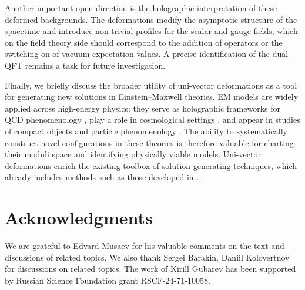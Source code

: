 \documentclass[12pt, utf8]{article}
\numberwithin{equation}{section}
\begin{document}
Another important open direction is the holographic interpretation of these deformed backgrounds. The deformations modify the asymptotic structure of the spacetime and introduce non-trivial profiles for the scalar and gauge fields, which on the field theory side should correspond to the addition of operators or the switching on of vacuum expectation values. A precise identification of the dual QFT remains a task for future investigation.

Finally, we briefly discuss the broader utility of uni-vector deformations as a tool for generating new solutions in Einstein--Maxwell theories. 
EM models are widely applied across high-energy physics: they serve as holographic frameworks for QCD phenomenology \cite{Rannu:2021pcq,Arefeva:2024mtl,Lilani:2025wnd,Zeng:2025tcz,Sachan:2013zza}, play a role in cosmological settings \cite{Ghezelbash:2015dka,Dunajski:2010uv}, and appear in studies of compact objects and particle phenomenology \cite{Raza:2025uda,Junior:2021svb,DeFelice:2025vef}. 
The ability to systematically construct novel configurations in these theories is therefore valuable for charting their moduli space and identifying physically viable models. 
Uni-vector deformations enrich the existing toolbox of solution-generating techniques, which already includes methods such as those developed in \cite{Cadoni:2018pav,Vigano:2022hrg,Yazadjiev:2006ew,Gubarev:2025hvr}. 


\section*{Acknowledgments}

We are grateful to Edvard Musaev for his valuable comments on the text and discussions of related topics. We also thank Sergei Barakin, Daniil Kolovertnov for discussions on related topics. The work of Kirill Gubarev has been supported by Russian Science Foundation grant RSCF-24-71-10058.





\end{document}
